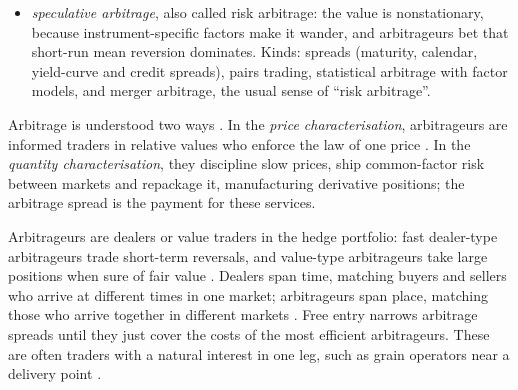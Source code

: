 \begin{qfdefinition}
\begin{itemize}
\emph{Cyclic currency arbitrage with quotes}. Write $S_{X/Y}$ for units of $Y$ per unit of $X$. The exact equality $S_{A/B}S_{B/C}=S_{A/C}$ is the no-arbitrage condition only in a frictionless market with one price per pair; with quotes it need not hold for midpoints. For example, with EUR/USD 1.0999/1.1001, USD/JPY 109.99/110.01 and EUR/JPY 120.99/121.03, the synthetic midpoint is 121.00 and the direct one 121.01, yet the two cycles return 0.99957 (via USD) and 0.99974 (via JPY) per euro, so neither is profitable.

With bid and ask, converting $X$ into $Y$ earns the bid of the $X/Y$ quote and converting $Y$ into $X$ pays its ask; starting from one unit of EUR, the two directions of the EUR--USD--JPY cycle return $b_{\text{EUR/USD}}\,b_{\text{USD/JPY}}/a_{\text{EUR/JPY}}$ and $b_{\text{EUR/JPY}}/(a_{\text{USD/JPY}}\,a_{\text{EUR/USD}})$, so there is no cyclic arbitrage if and only if the direct quote overlaps the synthetic band:
\[ b_{\text{EUR/USD}}\,b_{\text{USD/JPY}}\le a_{\text{EUR/JPY}}\quad\text{and}\quad b_{\text{EUR/JPY}}\le a_{\text{EUR/USD}}\,a_{\text{USD/JPY}} \]
Arbitrage parity holds only within this band, widened by spreads, funding and settlement costs; it is not an equality.
\item \emph{speculative arbitrage}, also called risk arbitrage: the value is nonstationary, because instrument-specific factors make it wander, and arbitrageurs bet that short-run mean reversion dominates. Kinds: spreads (maturity, calendar, yield-curve and credit spreads), pairs trading, statistical arbitrage with factor models, and merger arbitrage, the usual sense of ``risk arbitrage''.
\end{itemize}
Arbitrage is understood two ways \citep[same chap., secs.~17.6 and~17.9, pp.~375--378]{alpha-harris}. In the \emph{price characterisation}, arbitrageurs are informed traders in relative values who enforce the law of one price \citep[chap.~``Informed Traders and Market Efficiency'', sec.~10.5.4, pp.~232--235]{alpha-harris}. In the \emph{quantity characterisation}, they discipline slow prices, ship common-factor risk between markets and repackage it, manufacturing derivative positions; the arbitrage spread is the payment for these services.

 Arbitrageurs are dealers or value traders in the hedge portfolio: fast dealer-type arbitrageurs trade short-term reversals, and value-type arbitrageurs take large positions when sure of fair value \citep[chap.~``Arbitrageurs'', sec.~17.2, pp.~349--350]{alpha-harris}. Dealers span time, matching buyers and sellers who arrive at different times in one market; arbitrageurs span place, matching those who arrive together in different markets \citep[same chap., sec.~17.7, p.~376]{alpha-harris}. Free entry narrows arbitrage spreads until they just cover the costs of the most efficient arbitrageurs. These are often traders with a natural interest in one leg, such as grain operators near a delivery point \citep[same chap., sec.~17.8, pp.~377--378]{alpha-harris}.


\end{qfdefinition}
